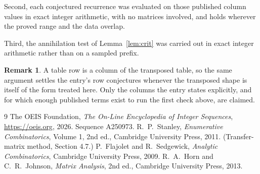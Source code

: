 \documentclass[11pt,a4paper]{article}
\theoremstyle{plain}
\theoremstyle{definition}
\newtheorem{remark}[theorem]{Remark}
\begin{document}
Second, each conjectured recurrence was evaluated on those published column values in exact
integer arithmetic, with no matrices involved, and holds wherever the proved range and the
data overlap.

Third, the annihilation test of Lemma~\ref{lem:crit} was carried out in exact integer
arithmetic rather than on a sampled prefix.

\begin{remark}
A table row is a column of the transposed table, so the same argument settles the entry's row
conjectures whenever the transposed shape is itself of the form treated here. Only the columns
the entry states explicitly, and for which enough published terms exist to run the first check
above, are claimed.
\end{remark}

\begin{thebibliography}{9}
 The OEIS Foundation, \emph{The On-Line Encyclopedia of Integer
Sequences}, \url{https://oeis.org}, 2026. Sequence A250973.
 R.~P.~Stanley, \emph{Enumerative Combinatorics}, Volume 1, 2nd ed.,
Cambridge University Press, 2011. (Transfer-matrix method, Section 4.7.)
 P.~Flajolet and R.~Sedgewick, \emph{Analytic Combinatorics}, Cambridge
University Press, 2009.
 R.~A.~Horn and C.~R.~Johnson, \emph{Matrix Analysis}, 2nd ed., Cambridge
University Press, 2013.
\end{thebibliography}
\end{document}

